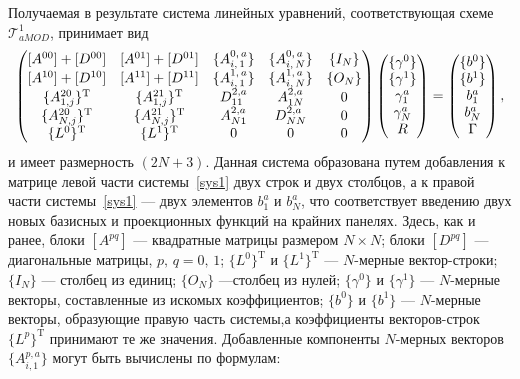 \documentclass[12pt, a4paper]{article}
\begin{document}
Получаемая в результате система линейных уравнений, соответствующая схеме $\mathcal{T}^1_{aMOD}$, принимает вид
\begin{equation}
\label{sys1asymp}
\left(
\begin{array}{@{}ccccc@{}}
[A^{00}] + [D^{00}] & [A^{01}] + [D^{01}] & \{A^{0,\,a}_{i,\,1}\} & \{A^{0,\,a}_{i,\,N}\} & \{I_N\} \\
{[}A^{10}{]} + [D^{10}] & [A^{11}] + [D^{11}] & \{A^{1,\,a}_{i,\,1}\} & \{A^{1,\,a}_{i,\,N}\} & \{O_N\} \\
\{A^{20}_{1,j}\}^\mathrm{T} &\{A^{21}_{1,j}\}^\mathrm{T} & D_{11}^{2,a} &  A^{2,a}_{1N} & 0\\
\{A^{20}_{N,j}\}^\mathrm{T} & \{A^{21}_{N,j}\}^\mathrm{T} & A^{2,a}_{N1} & D_{NN}^{2,a} & 0\\
\{L^0\}^\mathrm{T} & \{L^1\}^\mathrm{T} & 0 & 0 & 0
\end{array}
\right)
\left(
\begin{array}{@{}c@{}}
\{\gamma^0\} \\
\{\gamma^1\} \\
\gamma^a_1\\
\gamma^a_N\\
R
\end{array}
\right)
=
\left(
\begin{array}{@{}c@{}}
\{b^0\} \\
\{b^1\} \\
b^a_1\\
b^a_N\\
\Gamma
\end{array}
\right),
\end{equation}
и имеет размерность $(2N+3)$. Данная система образована путем добавления к матрице левой части системы~\eqref{sys1} двух строк и двух столбцов, а к правой части системы~\eqref{sys1} --- двух элементов $b^a_1$ и $b^a_N$, что соответствует введению двух новых базисных и проекционных функций на крайних панелях. Здесь, как и ранее, блоки $[A^{pq}]$ --- квадратные матрицы размером $N\times N$; блоки $[D^{pq}]$ --- диагональные матрицы, $p,\,q = 0,\,1$; $\{L^0\}^{\mathrm{T}}$ и $\{L^1\}^{\mathrm{T}}$ --- $N$-мерные вектор-строки; $\{I_N\}$ --- столбец из единиц; $\{O_N\}$ ---столбец из нулей; $\{\gamma^0\}$ и $\{\gamma^1\}$ --- $N$-мерные векторы, составленные из искомых коэффициентов; $\{b^0\}$ и $\{b^1\}$ --- $N$-мерные векторы, образующие правую часть системы,а коэффициенты векторов-строк $\{L^p\}^{\mathrm{T}}$ принимают те же значения. Добавленные компоненты $N$-мерных векторов $\{A_{i,1}^{p,a}\}$ могут быть вычислены по формулам:
\end{document}
